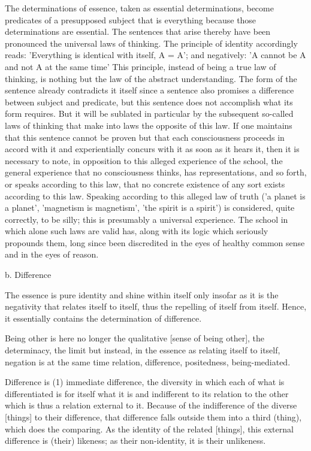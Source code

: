     The determinations of essence, taken as essential determinations,
    become predicates of a presupposed subject that is everything because
    those determinations are essential.
    The sentences that arise thereby have been pronounced
    the universal laws of thinking.
    The principle of identity accordingly reads:
    'Everything is identical with itself, A = A';
    and negatively:
    'A cannot be A and not A at the same time'
    This principle, instead of being a true law of thinking,
    is nothing but the law of the abstract understanding.
    The form of the sentence already contradicts it itself
    since a sentence also promises a difference between subject and predicate,
    but this sentence does not accomplish what its form requires.
    But it will be sublated in particular by the subsequent so-called
    laws of thinking that make into laws the opposite of this law.
    If one maintains that this sentence cannot be proven but that
    each consciousness proceeds in accord with it and
    experientially concurs with it as soon as it hears it,
    then it is necessary to note,
    in opposition to this alleged experience of the school,
    the general experience that no consciousness thinks,
    has representations, and so forth, or speaks according to this law,
    that no concrete existence of any sort exists according to this law.
    Speaking according to this alleged law of truth
    ('a planet is a planet', 'magnetism is magnetism', 'the spirit is a spirit')
    is considered, quite correctly, to be silly;
    this is presumably a universal experience.
    The school in which alone such laws are valid has,
    along with its logic which seriously propounds them,
    long since been discredited in the eyes of
    healthy common sense and in the eyes of reason.

b. Difference

The essence is pure identity and shine within itself only insofar
as it is the negativity that relates itself to itself,
thus the repelling of itself from itself.
Hence, it essentially contains the determination of difference.

    Being other is here no longer the qualitative [sense of being other],
    the determinacy, the limit but instead, in the essence as
    relating itself to itself, negation is at the same time relation,
    difference, positedness, being-mediated.

Difference is (1) immediate difference,
the diversity in which each of what is differentiated is
for itself what it is and indifferent to its relation to the other
which is thus a relation external to it.
Because of the indifference of the diverse [things] to their difference,
that difference falls outside them into a third (thing), which does the comparing.
As the identity of the related [things],
this external difference is (their) likeness;
as their non-identity, it is their unlikeness.

